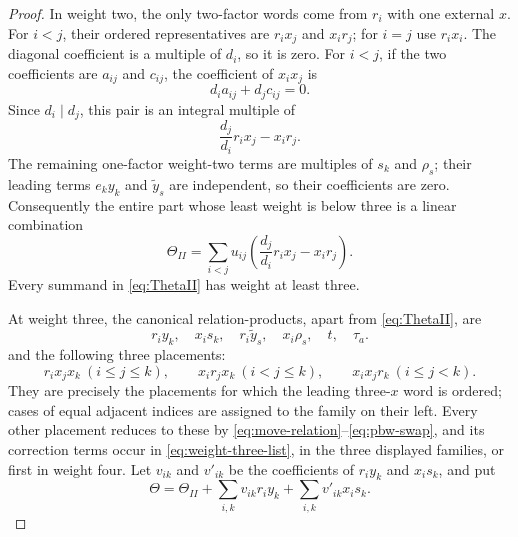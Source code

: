 \documentclass[11pt]{amsart}
\theoremstyle{definition}
\theoremstyle{remark}
\begin{document}
\begin{proof}
In weight two, the only two-factor words come from \(r_i\) with one
external \(x\).  For \(i<j\), their ordered representatives are
\(r_ix_j\) and \(x_ir_j\); for \(i=j\) use \(r_ix_i\).  The diagonal
coefficient is a multiple of \(d_i\), so it is zero.  For \(i<j\),
if the two coefficients are \(a_{ij}\) and \(c_{ij}\), the coefficient
of \(x_ix_j\) is
\[
                         d_i a_{ij}+d_jc_{ij}=0.
\]
Since \(d_i\mid d_j\), this pair is an integral multiple of
\[
                    \frac{d_j}{d_i}r_ix_j-x_ir_j.
\]
The remaining one-factor weight-two terms are multiples of \(s_k\)
and \(\rho_s\); their leading terms \(e_ky_k\) and
\(\widetilde y_s\) are independent, so their coefficients are zero.
Consequently the entire part whose least weight is below three is a
linear combination
\begin{equation}\label{eq:ThetaII}
 \Theta_{II}=
 \sum_{i<j}u_{ij}
 \left(\frac{d_j}{d_i}r_ix_j-x_ir_j\right).
\end{equation}
Every summand in \eqref{eq:ThetaII} has weight at least three.

At weight three, the canonical relation-products, apart from
\eqref{eq:ThetaII}, are
\begin{equation}\label{eq:weight-three-list}
 r_i y_k,\quad x_i s_k,
\quad r_i\widetilde y_s,\quad x_i\rho_s,
\quad t,\quad\tau_a.
\end{equation}
and the following three placements:
\[
 r_i x_jx_k\ (i\leq j\leq k),\qquad
 x_i r_jx_k\ (i<j\leq k),\qquad
 x_ix_jr_k\ (i\leq j<k).
\]
They are precisely the placements for which the leading
three-\(x\) word is ordered; cases of equal adjacent indices are
assigned to the family on their left.  Every other placement reduces
to these by \eqref{eq:move-relation}--\eqref{eq:pbw-swap}, and its
correction terms occur in \eqref{eq:weight-three-list}, in the three
displayed families, or first in weight four.
Let \(v_{ik}\) and
\(v'_{ik}\) be the coefficients of \(r_iy_k\) and \(x_is_k\), and put
\[
                  \Theta=\Theta_{II}
                    +\sum_{i,k}v_{ik}r_iy_k
                    +\sum_{i,k}v'_{ik}x_is_k.
\]


\end{proof}
\end{document}
